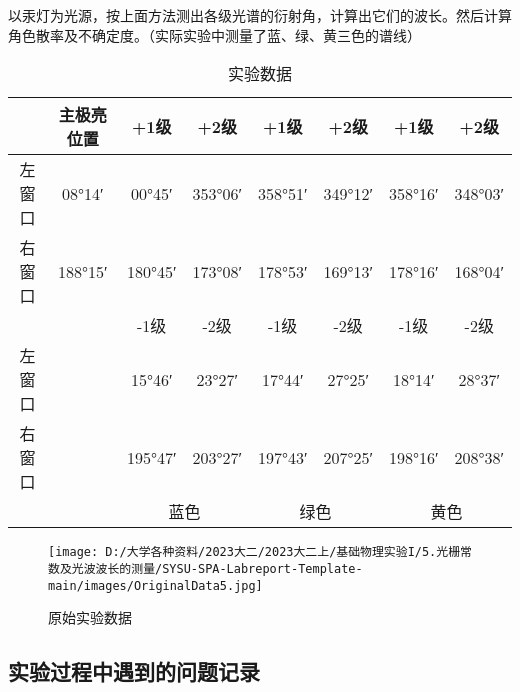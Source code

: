 \documentclass[dvipsnames, svgnames,a4paper,11pt]{article}
\begin{document}
		以汞灯为光源，按上面方法测出各级光谱的衍射角，计算出它们的波长。然后计算角色散率及不确定度。（实际实验中测量了蓝、绿、黄三色的谱线）
		
	\begin{table}[htbp]
		\centering
		\begin{tabular}{|c|c|c|c|c|c|c|c|}
			\hline
			& 主极亮位置 & +1级 & +2级 & +1级 & +2级 & +1级 & +2级 \\
			\hline
			左窗口 & 08°14′ & 00°45′ & 353°06′ & 358°51′ & 349°12′ & 358°16′ & 348°03′ \\
			\hline
			右窗口 & 188°15′ & 180°45′ & 173°08′ & 178°53′ & 169°13′ & 178°16′ & 168°04′ \\
			\hline
			& & -1级 & -2级 & -1级 & -2级 & -1级 & -2级 \\
			\hline
			左窗口 & & 15°46′ & 23°27′ & 17°44′ & 27°25′ & 18°14′ & 28°37′ \\
			\hline
			右窗口 & & 195°47′ & 203°27′ & 197°43′ & 207°25′ & 198°16′ & 208°38′ \\
			\hline
			\multicolumn{2}{|c}{} &\multicolumn{2}{|c|}{蓝色} & \multicolumn{2}{c|}{绿色} & \multicolumn{2}{c|}{黄色} \\
			\hline
		\end{tabular}
		\caption{实验数据}
		\label{tab:data2}
	\end{table}
	
		
		
		\begin{figure}[H]
			\centering
			\texttt{[image: D:/大学各种资料/2023大二/2023大二上/基础物理实验I/5.光栅常数及光波波长的测量/SYSU-SPA-Labreport-Template-main/images/OriginalData5.jpg]}
			\caption{原始实验数据}
		\end{figure}







\subsection{实验过程中遇到的问题记录}
\end{document}
